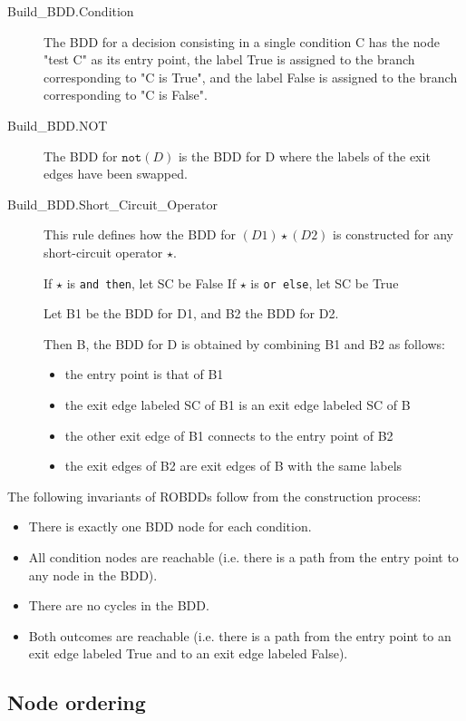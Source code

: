 \documentclass[a4paper,12pt,twoside]{article}
\newcommand{\anysc}{\star}
\newcommand{\andthen}{\texttt{and then}}
\newcommand{\orelse}{\texttt{or else}}
\newcommand{\adanot}{\texttt{not}}
\begin{document}
\begin{description}
\item[Build\_BDD.Condition]
  The BDD for a decision consisting in a single condition C has the node
  "test C" as its entry point, the label True is assigned to the branch
  corresponding to "C is True", and the label False is assigned to the
  branch corresponding to "C is False".

\item[Build\_BDD.NOT]
  The BDD for $\adanot{} (D)$ is the BDD for D where the labels of the exit
  edges have been swapped.

\item[Build\_BDD.Short\_Circuit\_Operator]
  This rule defines how the BDD for $(D1) \anysc{} (D2)$ is constructed for
  any short-circuit operator $\anysc{}$.

  If $\anysc{}$ is \andthen{}, let SC be False
  If $\anysc{}$ is \orelse{}, let SC be True

  Let B1 be the BDD for D1, and B2 the BDD for D2.

  Then B, the BDD for D is obtained by combining B1 and B2 as follows:
  \begin{itemize}
    \item the entry point is that of B1
    \item the exit edge labeled SC of B1 is an exit edge labeled SC of B
    \item the other exit edge of B1 connects to the entry point of B2
    \item the exit edges of B2 are exit edges of B with the same labels
  \end{itemize}
\end{description}

The following invariants of ROBDDs follow from the construction process:
\begin{itemize}
  \item There is exactly one BDD node for each condition.
  \item All condition nodes are reachable (i.e. there is a path from
        the entry point to any node in the BDD).
  \item There are no cycles in the BDD.
  \item Both outcomes are reachable (i.e. there is a path from the entry point
        to an exit edge labeled True and to an exit edge labeled False).
\end{itemize}

\subsection{Node ordering}
\end{document}
